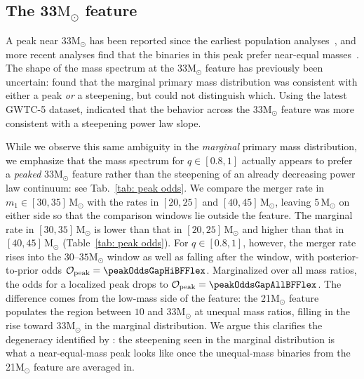 \documentclass[%
 onecolumn,
 amsmath,amssymb,
 aps,
 prl,
 nofootinbib,nobibnotes,
]{revtex4-2}
\newcommand{\Msun}{\ensuremath{\mathrm{M}_{\odot}}}
\newcommand{\red}[1]{{\color{Red} #1}}
\newcommand{\featTen}{10\xspace}
\newcommand{\featTwenty}{21\xspace}
\newcommand{\featThirtyFive}{33\xspace}
\begin{document}
\subsection{The \featThirtyFive $\Msun$ feature}

A peak near \featThirtyFive $\Msun$ has been reported since the earliest population analyses~\cite{Talbot:2018cva, LIGOScientific:2018jsj, LIGOScientific:2020kqk, KAGRA:2021duu, Farah:2023vsc}, and more recent analyses find that the binaries in this peak prefer near-equal masses~\cite{Roy:2025ktr, Sridhar:2025kvi}. The shape of the mass spectrum at the \featThirtyFive $\Msun$ feature has previously been uncertain: \citet{LIGOScientific:2025pvj} found that the marginal primary mass distribution was consistent with either a peak \textit{or} a steepening, but could not distinguish which. Using the latest \ac{GWTC-5} dataset, \citet{LIGOScientific:2026ctl} indicated that the behavior across the \featThirtyFive $\Msun$ feature was more consistent with a steepening power law slope. 

While we observe this same ambiguity in the \textit{marginal} primary mass distribution, we emphasize that the mass spectrum for $q\in [0.8, 1]$ actually appears to prefer a \textit{peaked} \featThirtyFive $\Msun$ feature rather than the steepening of an already decreasing power law continuum: see Tab.~\ref{tab: peak odds}. \red{We compare the merger rate in $m_1 \in [30, 35]\,\Msun$ with the rates in $[20, 25]$ and $[40, 45]\,\Msun$, leaving $5\,\Msun$ on either side so that the comparison windows lie outside the feature. The marginal rate in $[30, 35]\,\Msun$ is lower than that in $[20, 25]\,\Msun$ and higher than that in $[40, 45]\,\Msun$ (Table~\ref{tab: peak odds}).} For $q \in [0.8, 1]$, however, the merger rate rises into the $30$--$35\Msun$ window as well as falling after the window, with posterior-to-prior odds $\mathcal{O}_{\rm peak} = \peakOddsGapHiBFFlex$. Marginalized over all mass ratios, the odds for a localized peak drops to $\mathcal{O}_{\rm peak} = \peakOddsGapAllBFFlex$. The difference comes from the low-mass side of the feature: the \featTwenty $\Msun$ feature populates the region between $\featTen$ and \featThirtyFive $\Msun$ at unequal mass ratios, filling in the rise toward \featThirtyFive $\Msun$ in the marginal distribution. We argue this clarifies the degeneracy identified by \citet{LIGOScientific:2025pvj}: the steepening seen in the marginal distribution is what a near-equal-mass peak looks like once the unequal-mass binaries from the \featTwenty $\Msun$ feature are averaged in.
\end{document}
